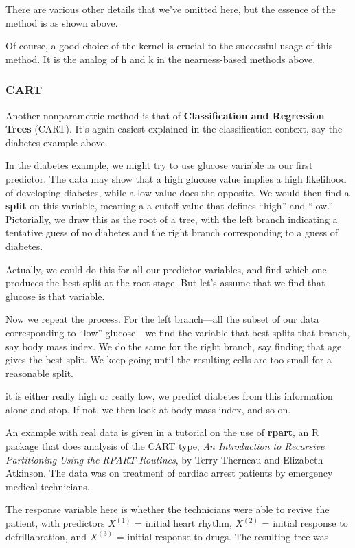 There are various other details that we've omitted here, but the essence
of the method is as shown above.

Of course, a good choice of the kernel is crucial to the successful
usage of this method.  It is the analog of h and k in the nearness-based
methods above.

\subsubsection{CART}

Another nonparametric method is that of {\bf Classification and
Regression Trees} (CART).  It's again easiest explained in the
classification context, say the diabetes example above.

In the diabetes example, we might try to use glucose variable as our
first predictor.  The data may show that a high glucose value implies a
high likelihood of developing diabetes, while a low value does the
opposite.  We would then find a {\bf split} on this variable, meaning a
a cutoff value that defines ``high'' and ``low.''  Pictorially, we draw
this as the root of a tree, with the left branch indicating a tentative
guess of no diabetes and the right branch corresponding to a guess of
diabetes.

Actually, we could do this for all our predictor variables, and find
which one produces the best split at the root stage.  But let's assume
that we find that glucose is that variable.

Now we repeat the process.  For the left branch---all the subset of our
data corresponding to ``low'' glucose---we find the variable that best
splits that branch, say body mass index.  We do the same for the right
branch, say finding that age gives the best split.  We keep going until
the resulting cells are too small for a reasonable split.

it is either really high or really low, we predict diabetes from this
information alone and stop.  If not, we then look at body mass index,
and so on.

An example with real data is given in a tutorial on the use of {\bf
rpart}, an R package that does analysis of the CART type, {\it An
Introduction to Recursive Partitioning Using the RPART Routines}, by
Terry Therneau and Elizabeth Atkinson.  The data was on treatment of
cardiac arrest patients by emergency medical technicians.

The response variable here is whether the technicians were able to
revive the patient, with predictors $X^{(1)}$ = initial heart rhythm,
$X^{(2)}$ = initial response to defrillabration, and $X^{(3)}$ = initial
response to drugs.  The resulting tree was

